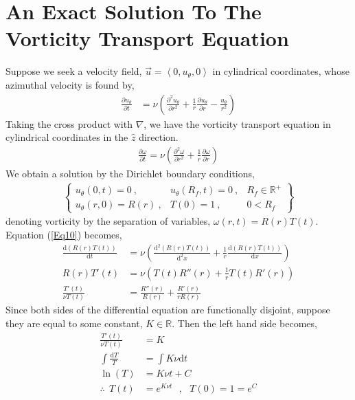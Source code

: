 \documentclass{article}
\begin{document}
\section{An Exact Solution To The Vorticity Transport Equation}
Suppose we seek a velocity field, $\vec{u}=\left<0,u_\theta,0\right>$ in cylindrical coordinates, whose azimuthal velocity is found by,
\begin{align*}
    \frac{\partial u_\theta}{\partial t}&=\nu \left(\frac{\partial^2 u_\theta}{\partial r^2}+\frac{1}{r}\frac{\partial u_\theta}{\partial r} -\frac{u_\theta}{r^2}\right)
\end{align*}
Taking the cross product with $\nabla$, we have the vorticity transport equation in cylindrical coordinates in the $\hat{z}$ direction.
\begin{align}\label{Eq10}
    \frac{\partial \omega}{\partial t}=\nu \left(\frac{\partial^2 \omega}{\partial r^2}+\frac{1}{r}\frac{\partial \omega}{\partial r}\right)
\end{align}
We obtain a solution by the Dirichlet boundary conditions,
\begin{align*}
    \left\{\begin{matrix}
    u_\theta(0,t) =0 \:,& u_\theta(R_f,t)=0 \:,& R_f\in \mathbb{R}^+\\ 
    u_\theta(r,0)=R(r) \:,& T(0)=1 \:,& 0<R_f
    \end{matrix} \right\}
\end{align*}
denoting vorticity by the separation of variables, $\omega(r,t)=R(r)T(t)$. 
Equation (\ref{Eq10}) becomes,
\begin{align*}
     \frac{\mathrm{d}\left( R(r)T(t)\right)}{\mathrm{d} t} &= \nu \left(\frac{\mathrm{d}^2\left( R(r)T(t)\right)}{\mathrm{d}^2 x}+\frac{1}{r} \frac{\mathrm{d}\left( R(r)T(t)\right)}{\mathrm{d}x} \right)\\
     R(r)T'(t) &= \nu \left(T(t)R''(r)+\frac{1}{r} T(t)R'(r) \right) \\
     \frac{T'(t)}{\nu T(t)}&= \frac{R''(r)}{R(r)}+\frac{R'(r)}{rR(r)}
\end{align*}
Since both sides of the differential equation are functionally disjoint, suppose they are equal to some constant, $K\in \mathbb{R}$. Then the left hand side becomes,
\begin{align*}
    \frac{T'(t)}{\nu T(t)}&=K \\
    \int \frac{\mathrm{d}T}{T}&=\int K\nu \mathrm{d}t \\
    \ln(T) &=K\nu t+C \\
    \therefore \:\: T(t) &=e^{K\nu t} \:\:\:,\:\:\: T(0)=1=e^C
\end{align*}
\end{document}
